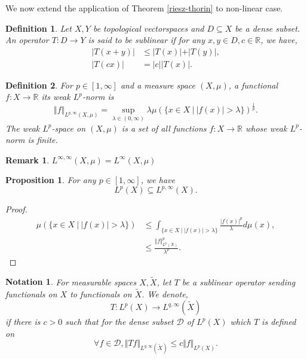 \documentclass[8pt]{article}
\newtheorem{proposition}{Proposition}[section]
\newtheorem{definition}{Definition}[section]
\newtheorem{notation}{Notation}[section]
\newtheorem{remark}{Remark}[section]
\newcommand{\norm}[1]{\Vert #1 \Vert}
\newcommand{\ab}[1]{\vert #1 \vert}
\newcommand{\sep}[0]{\:\vert\:}
\newcommand{\bR}[0]{\mathbb{R}}
\newcommand{\cD}[0]{\mathcal{D}}
\begin{document}
We now extend the application of Theorem \ref{riesz-thorin} to non-linear case.
\begin{definition}
  Let $X,Y$ be topological vectorspaces and $D\subseteq X$ be a dense subset. An operator $T:D\to Y$ is said to be sublinear if for any $x,y\in D, c\in\bR$, we have,
  \begin{align*}
    \ab{T(x+y)}&\leq \ab{T(x)}+\ab{T(y)},\\
    \ab{T(cx)} &= \ab{c}\ab{T(x)}.
  \end{align*}
\end{definition}
\begin{definition}
  For $p\in[1,\infty]$ and a measure space $(X,\mu)$, a functional $f:X\to \bR$ its weak $L^p$-norm is 
  \begin{equation*}
    \norm{f}_{L^{p,\infty}(X,\mu)} = \sup_{\lambda\in(0,\infty)}\lambda\mu(\{x\in X\sep \ab{f(x)}>\lambda\})^{{\frac 1 p}}.
  \end{equation*}
  The weak $L^p$-space on $(X,\mu)$ is a set of all functions $f:X\to \bR$ whose weak $L^p$-norm is finite.
\end{definition}
\begin{remark}
  $L^{\infty,\infty}(X,\mu)=L^\infty(X,\mu)$
\end{remark}
\begin{proposition}
  \label{proposition_2_1}
  For any $p\in[1,\infty]$, we have 
  \begin{equation*}
    L^p(X)\subseteq L^{p,\infty}(X).
  \end{equation*}
\end{proposition}
\begin{proof}
  \begin{align*}
    \mu(\{x\in X\sep \ab{f(x)}>\lambda\}) & \leq \int_{\{x\in X\sep \ab{f(x)}>\lambda\}}{\frac {\ab{f(x)}^p} {\lambda}}d\mu(x),\\
    &\leq {\frac {\norm{f}_{L^p(X)}^p} {\lambda^p}}.
  \end{align*}
\end{proof}
\begin{notation}
  For measurable spaces $X,\tilde{X}$, let $T$ be a sublinear operator sending functionals on $X$ to functionals on $\tilde{X}$. We denote,
  \begin{equation*}
    T:L^p(X)\to L^{q,\infty}(\tilde{X})
  \end{equation*}
  if there is $c>0$ such that for the dense subset $\cD$ of $L^p(X)$ which $T$ is defined on 
  \begin{equation*}
    \forall f\in\cD, \norm{Tf}_{L^{q,\infty}(\tilde{X})}\leq c\norm{f}_{L^p(X)}.
  \end{equation*}
\end{notation}
\end{document}

